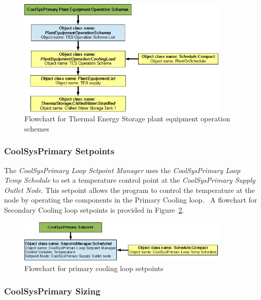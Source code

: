 \begin{figure}[htbp] %
\centering
\includegraphics[width=0.9\textwidth, height=0.9\textheight, keepaspectratio=true]{media/image058.png}
\caption{Flowchart for Thermal Energy Storage plant equipment operation schemes \protect \label{fig:flowchart-for-thermal-energy-storage-plant-equipment-operation}}
\end{figure}

\subsubsection{CoolSysPrimary Setpoints}\label{coolsysprimary-setpoints}

The \emph{CoolSysPrimary Loop Setpoint Manager} uses the \emph{CoolSysPrimary Loop Temp Schedule} to set a temperature control point at the \emph{CoolSysPrimary Supply Outlet Node}. This setpoint allows the program to control the temperature at the node by operating the components in the Primary Cooling loop. ~A flowchart for Secondary Cooling loop setpoints is provided in Figure~\ref{fig:flowchart-for-primary-cooling-loop-setpoints}.

\begin{figure}[htbp] %
\centering
\includegraphics[width=0.9\textwidth, height=0.9\textheight, keepaspectratio=true]{media/image059.png}
\caption{Flowchart for primary cooling loop setpoints \protect \label{fig:flowchart-for-primary-cooling-loop-setpoints}}
\end{figure}

\subsubsection{CoolSysPrimary Sizing}\label{coolsysprimary-sizing}

